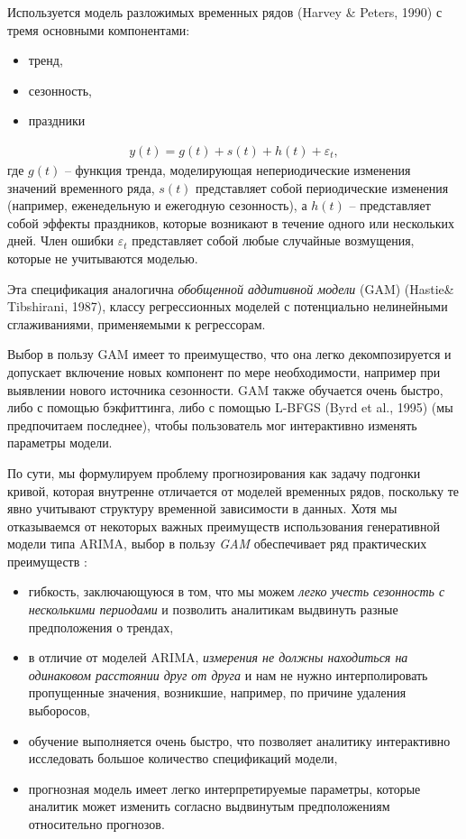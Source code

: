 \documentclass[%
	11pt,
	a4paper,
	utf8,
		]{article}
\begin{document}
Используется модель разложимых временных рядов (Harvey \& Peters, 1990) с тремя основными компонентами:
\begin{itemize}
	\item тренд,
	
	\item сезонность,
	
	\item праздники
\end{itemize}
\begin{align*}
y(t) = g(t) + s(t) + h(t) + \varepsilon_t,
\end{align*}
где $g(t)$ -- функция тренда, моделирующая непериодические изменения значений временного ряда, $s(t)$ представляет собой периодические изменения (например, еженедельную и ежегодную сезонность), а $h(t)$ -- представляет собой эффекты праздников, которые возникают в течение одного или нескольких дней. Член ошибки $\varepsilon_t$ представляет собой любые случайные возмущения, которые не учитываются моделью. 

Эта спецификация аналогична \emph{обобщенной аддитивной модели} (GAM) (Hastie\& Tibshirani, 1987), классу регрессионных моделей с потенциально нелинейными сглаживаниями, применяемыми к регрессорам.

Выбор в пользу GAM имеет то преимущество, что она легко декомпозируется и допускает включение новых компонент по мере необходимости, например при выявлении нового источника сезонности. GAM также обучается очень быстро, либо с помощью бэкфиттинга, либо с помощью L-BFGS (Byrd et al., 1995) (мы предпочитаем последнее), чтобы пользователь мог интерактивно изменять параметры модели.

По сути, мы формулируем проблему прогнозирования как задачу подгонки кривой, которая внутренне отличается от моделей временных рядов, поскольку те явно учитывают структуру временной зависимости в данных. Хотя мы отказываемся от некоторых важных преимуществ использования генеративной модели типа ARIMA, выбор в пользу \emph{GAM} обеспечивает ряд практических преимуществ \cite[]{gruzdev:time-series-2022}:
\begin{itemize}
	\item гибкость, заключающуюся в том, что мы можем \emph{легко учесть сезонность с несколькими периодами} и позволить аналитикам выдвинуть разные предположения о трендах,
	
	\item в отличие от моделей ARIMA, \emph{измерения не должны находиться на одинаковом расстоянии друг от друга} и нам не нужно интерполировать пропущенные значения, возникшие, например, по причине удаления выборосов,
	
	\item обучение выполняется очень быстро, что позволяет аналитику интерактивно исследовать большое количество спецификаций модели,
	
	\item прогнозная модель имеет легко интерпретируемые параметры, которые аналитик может изменить согласно выдвинутым предположениям относительно прогнозов.
\end{itemize}
\end{document}
